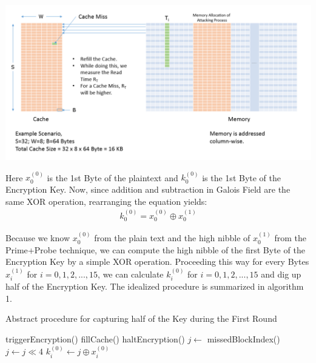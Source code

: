 \documentclass[3p]{elsarticle}
\begin{document}
\begin{center}
\includegraphics[scale=0.4,natwidth=1159,natheight=589]{Figures/probe(new).png}
\label{fig: Demonstration of the Probe phase.}
\end{center}

Here $x_0^{(0)}$ is the 1st Byte of the plaintext and $k_0^{(0)}$ is the 1st Byte of the Encryption Key. Now, since addition and subtraction in Galois Field are the same XOR operation, rearranging the equation yields:
\begin{align*}
k_0^{(0)}=x_0^{(0)} \oplus x_0^{(1)}
\end{align*}

Because we know $x_0^{(0)}$ from the plain text and the high nibble of $x_0^{(1)}$ from the Prime+Probe technique, we can compute the high nibble of the first Byte of the Encryption Key by a simple XOR operation. Proceeding this way for every Bytes $x_i^{(1)}$ for $i=0,1,2,...,15$, we can calculate $k_i^{(0)}$ for $i=0,1,2,...,15$ and dig up half of the Encryption Key. The idealized procedure is summarized in algorithm 1.

\begin{algorithm}
\caption{Abstract procedure for capturing half of the Key during the First Round}
\label{Abstract procedure for capturing half of the Key during the First Round}
\begin{algorithmic}[1]
	\State triggerEncryption()
		\State fillCache()
		\State haltEncryption()
		\State $j \gets$ missedBlockIndex()
		\State $j \gets j\ll 4$
		\State $k_i^{(0)} \gets j \oplus x_i^{(0)}$
	\EndFor
\end{algorithmic}
\end{algorithm}
\end{document}

